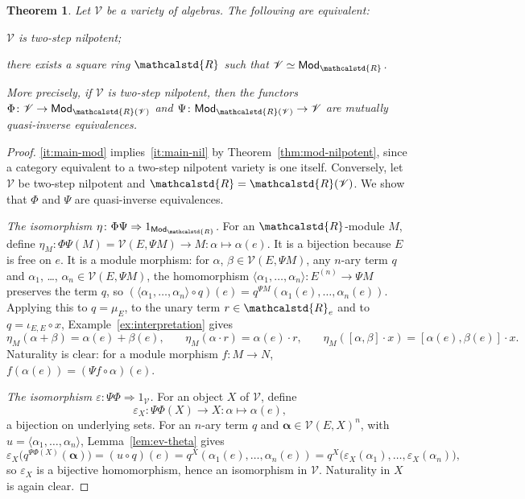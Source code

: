 \documentclass[reqno,a4paper]{amsart}
\theoremstyle{plain}
\newtheorem{theorem}[subsection]{Theorem}
\theoremstyle{definition}
\newcommand{\V}{\ensuremath{\mathcal{V}}}
\newcommand{\R}{\ensuremath{\mathcalstd{R}}}
\newcommand{\Mod}{\ensuremath{\mathsf{Mod}}}
\renewcommand{\Re}{\ensuremath{\R_{e}}}
\newcommand{\brk}[2]{\ensuremath{[#1,#2]}}
\begin{document}
\begin{theorem}\label{thm:main}
  Let \(\V\) be a variety of algebras. The following are equivalent:
  \begin{tfae}
    \item\label{it:main-nil} \(\V\) is two-step nilpotent;
    \item\label{it:main-mod} there exists a square ring \(\R\) such that \(\V\simeq\Mod_{\R}\).
  \end{tfae}
  More precisely, if \(\V\) is two-step nilpotent, then the functors \(\Phi\colon \V\to\Mod_{\R(\V)}\) and \(\Psi\colon \Mod_{\R(\V)}\to\V\) are mutually quasi-inverse equivalences.
\end{theorem}

\begin{proof}
  \ref{it:main-mod} implies~\ref{it:main-nil} by Theorem~\ref{thm:mod-nilpotent}, since a category equivalent to a two-step nilpotent variety is one itself. Conversely, let \(\V\) be two-step nilpotent and \(\R=\R(\V)\). We show that \(\Phi\) and \(\Psi\) are quasi-inverse equivalences.

  \emph{The isomorphism \(\eta\colon \Phi\Psi\Rightarrow 1_{\Mod_{\R}}\).} For an \(\R\)-module \(M\), define \(\eta_{M}\colon \Phi\Psi(M)=\V(E,\Psi M)\to M\colon \alpha\mapsto\alpha(e)\). It is a bijection because \(E\) is free on \(e\). It is a module morphism: for \(\alpha\), \(\beta\in\V(E,\Psi M)\), any \(n\)-ary term \(q\) and \(\alpha_{1}\), \dots, \(\alpha_{n}\in\V(E,\Psi M)\), the homomorphism \(\langle\alpha_{1},\dots,\alpha_{n}\rangle\colon E^{(n)}\to\Psi M\) preserves the term \(q\), so \((\langle\alpha_{1},\dots,\alpha_{n}\rangle\circ q)(e)=q^{\Psi M}(\alpha_{1}(e),\dots,\alpha_{n}(e))\). Applying this to \(q=\mu_{E}\), to the unary term \(r\in\Re\) and to \(q=\iota_{E,E}\circ x\), Example~\ref{ex:interpretation} gives
  \[
    \eta_{M}(\alpha+\beta)=\alpha(e)+\beta(e)\text{,}\qquad\eta_{M}(\alpha\cdot r)=\alpha(e)\cdot r\text{,}\qquad\eta_{M}(\brk{\alpha}{\beta}\cdot x)=\brk{\alpha(e)}{\beta(e)}\cdot x\text{.}
  \]
  Naturality is clear: for a module morphism \(f\colon M\to N\), \(f(\alpha(e))=(\Psi f\circ\alpha)(e)\).

  \emph{The isomorphism \(\varepsilon\colon \Psi\Phi\Rightarrow 1_{\V}\).} For an object \(X\) of \(\V\), define
  \[
    \varepsilon_{X}\colon \Psi\Phi(X)\to X\colon \alpha\mapsto\alpha(e)\text{,}
  \]
  a bijection on underlying sets. For an \(n\)-ary term \(q\) and \(\boldsymbol{\alpha}\in\V(E,X)^{n}\), with \(u=\langle\alpha_{1},\dots,\alpha_{n}\rangle\), Lemma~\ref{lem:ev-theta} gives
  \[
    \varepsilon_{X}\bigl(q^{\Psi\Phi(X)}(\boldsymbol{\alpha})\bigr)=(u\circ q)(e)=q^{X}(\alpha_{1}(e),\dots,\alpha_{n}(e))=q^{X}\bigl(\varepsilon_{X}(\alpha_{1}),\dots,\varepsilon_{X}(\alpha_{n})\bigr)\text{,}
  \]
  so \(\varepsilon_{X}\) is a bijective homomorphism, hence an isomorphism in \(\V\). Naturality in \(X\) is again clear.
\end{proof}
\end{document}
